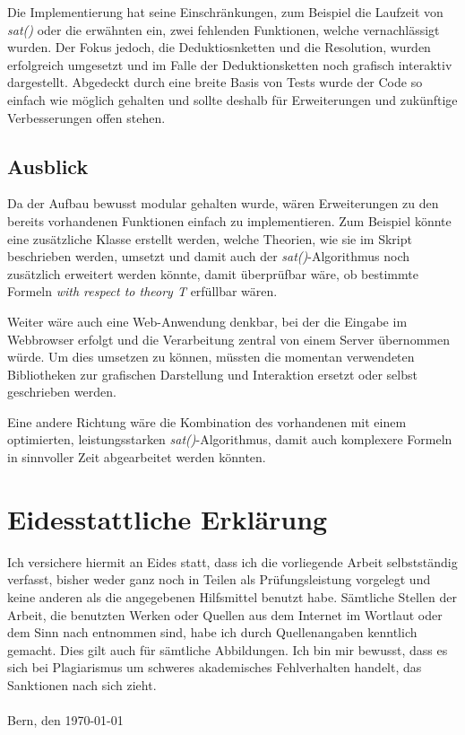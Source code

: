 \documentclass[11pt,a4paper,ngerman]{scrreprt}
\begin{document}
Die Implementierung hat seine Einschränkungen, zum Beispiel die Laufzeit von \textit{sat()} oder die erwähnten ein, zwei fehlenden Funktionen, welche vernachlässigt wurden.
Der Fokus jedoch, die Deduktiosnketten und die Resolution, wurden erfolgreich umgesetzt und im Falle der Deduktionsketten noch grafisch interaktiv dargestellt. Abgedeckt durch eine breite Basis von Tests wurde der Code so einfach wie möglich gehalten und sollte deshalb für Erweiterungen und zukünftige Verbesserungen offen stehen.

\section{Ausblick}
Da der Aufbau bewusst modular gehalten wurde, wären Erweiterungen zu den bereits vorhandenen Funktionen einfach zu implementieren. Zum Beispiel könnte eine zusätzliche Klasse erstellt werden, welche Theorien, wie sie im Skript beschrieben werden, umsetzt und damit auch der \textit{sat()}-Algorithmus noch zusätzlich erweitert werden könnte, damit überprüfbar wäre, ob bestimmte Formeln \textit{with respect to theory T} erfüllbar wären.

Weiter wäre auch eine Web-Anwendung denkbar, bei der die Eingabe im Webbrowser erfolgt und die Verarbeitung zentral von einem Server übernommen würde. Um dies umsetzen zu können, müssten die momentan verwendeten Bibliotheken zur grafischen Darstellung und Interaktion ersetzt oder selbst geschrieben werden.

Eine andere Richtung wäre die Kombination des vorhandenen mit einem optimierten, leistungsstarken \textit{sat()}-Algorithmus, damit auch komplexere Formeln in sinnvoller Zeit abgearbeitet werden könnten.

\chapter*{Eidesstattliche Erklärung}
Ich versichere hiermit an Eides statt, dass ich die vorliegende Arbeit selbstständig verfasst, bisher weder ganz noch in Teilen als Prüfungsleistung vorgelegt und keine anderen als die angegebenen Hilfsmittel benutzt habe.
Sämtliche Stellen der Arbeit, die benutzten Werken oder Quellen aus dem Internet im Wortlaut oder dem Sinn nach entnommen sind, habe ich durch Quellenangaben kenntlich gemacht. Dies gilt auch für sämtliche Abbildungen. Ich bin mir bewusst, dass es sich bei Plagiarismus um schweres akademisches Fehlverhalten handelt, das Sanktionen nach sich zieht.\\\\
Bern, den \today

\end{document}
